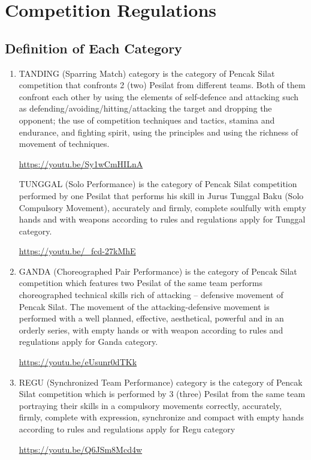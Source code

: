 \chapter{Competition Regulations}

\section{Definition of Each Category}

\begin{enumerate}
\item TANDING (Sparring Match) category is the category of Pencak Silat competition that confronts 2 (two) Pesilat from different teams. Both of them confront each other by using the elements of self-defence and attacking such as defending/avoiding/hitting/attacking the target and dropping the opponent; the use of competition techniques and tactics, stamina and endurance, and fighting spirit, using the principles and using the richness of movement of techniques.

\url{https://youtu.be/Sy1wCmHILnA}


TUNGGAL (Solo Performance) is the category of Pencak Silat competition performed by one Pesilat that performs his skill in Jurus Tunggal Baku (Solo Compulsory Movement), accurately and firmly, complete soulfully with empty hands and with weapons according to rules and regulations apply for Tunggal category.

\url{https://youtu.be/_fcd-27kMhE}

\item GANDA (Choreographed Pair Performance) is the category of Pencak Silat competition which features two Pesilat of the same team performs choreographed technical skills rich of attacking – defensive movement of Pencak Silat. The movement of the attacking-defensive movement is performed with a well planned, effective, aesthetical, powerful and in an orderly series, with empty hands or with weapon according to rules and regulations apply for Ganda category.

\url{https://youtu.be/eUsunr0dTKk}

\item REGU (Synchronized Team Performance) category is the category of Pencak Silat competition which is performed by 3 (three) Pesilat from the same team portraying their skills in a compulsory movements correctly, accurately, firmly, complete with expression, synchronize and compact with empty hands according to rules and regulations apply for Regu category 

\url{https://youtu.be/Q6JSm8Mcd4w}

\end{enumerate}



